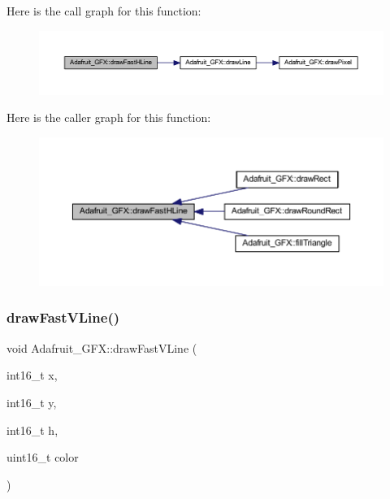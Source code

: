 Here is the call graph for this function\+:\nopagebreak
\begin{figure}[H]
\begin{center}
\leavevmode
\includegraphics[width=350pt]{class_adafruit___g_f_x_a4d42e7cc577c1eb5b06fe656786c9c79_cgraph}
\end{center}
\end{figure}
Here is the caller graph for this function\+:\nopagebreak
\begin{figure}[H]
\begin{center}
\leavevmode
\includegraphics[width=350pt]{class_adafruit___g_f_x_a4d42e7cc577c1eb5b06fe656786c9c79_icgraph}
\end{center}
\end{figure}
\mbox{\label{class_adafruit___g_f_x_a1cffbb1d69c5faf49cd0cff27686a837}} 
\subsubsection{\texorpdfstring{draw\+Fast\+V\+Line()}{drawFastVLine()}}
{\footnotesize\ttfamily void Adafruit\+\_\+\+G\+F\+X\+::draw\+Fast\+V\+Line (\begin{DoxyParamCaption}\item[{int16\+\_\+t}]{x,  }\item[{int16\+\_\+t}]{y,  }\item[{int16\+\_\+t}]{h,  }\item[{uint16\+\_\+t}]{color }\end{DoxyParamCaption})}

